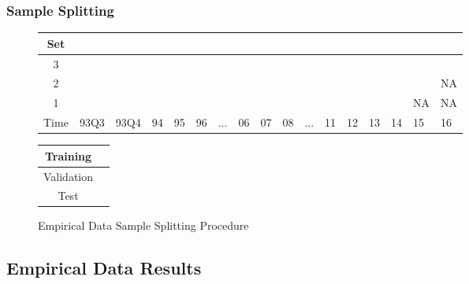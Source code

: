 \documentclass[aspectratio=169]{beamer}
\begin{document}
\begin{frame}
\frametitle{Sample Splitting}
\begin{figure}
	\begin{center}
		\begin{tabular}{|c|p{0.60cm}p{0.60cm}p{0.40cm}p{0.40cm}p{0.40cm}p{0.40cm}p{0.40cm}p{0.40cm}p{0.40cm}p{0.40cm}p{0.40cm}p{0.40cm}p{0.40cm}p{0.40cm}p{0.40cm}p{0.40cm}|}
			\hline
			Set &&&&&&&&&&&&&&&& \\
			\hline
			3 & \cellcolor{cyan} & \cellcolor{cyan} & \cellcolor{cyan} & \cellcolor{cyan} & \cellcolor{cyan} & \cellcolor{cyan} & \cellcolor{cyan} & \cellcolor{cyan} &
			\cellcolor{pink} & \cellcolor{pink} & \cellcolor{pink} & \cellcolor{pink} & \cellcolor{pink} & \cellcolor{pink} & \cellcolor{pink} & \cellcolor{olive} \\
			2 & \cellcolor{cyan} & \cellcolor{cyan} & \cellcolor{cyan} & \cellcolor{cyan} & \cellcolor{cyan} & \cellcolor{cyan} & \cellcolor{cyan} &
			\cellcolor{pink} & \cellcolor{pink} & \cellcolor{pink} & \cellcolor{pink} & \cellcolor{pink} & \cellcolor{pink} & \cellcolor{pink} & 	
			\cellcolor{olive} & NA \\
			1 & \cellcolor{cyan} & \cellcolor{cyan} & \cellcolor{cyan} & \cellcolor{cyan} & \cellcolor{cyan} & \cellcolor{cyan} &
			\cellcolor{pink} & \cellcolor{pink} & \cellcolor{pink} & \cellcolor{pink} & \cellcolor{pink} & \cellcolor{pink} & \cellcolor{pink} & \cellcolor{olive} & NA & NA \\
			\hline
			Time & 93Q3 & 93Q4 & 94 & 95 & 96 & ... & 06 & 07 & 08 & ... & 11 & 12 & 13 & 14 & 15 & 16 \\
			\hline
		\end{tabular}
		\medskip
		\begin{tabular}{|c|p{0.60cm}|}
			\hline
			Training & \cellcolor{cyan} \\
			\hline
			Validation & \cellcolor{pink} \\
			\hline
			Test & \cellcolor{olive} \\
			\hline
		\end{tabular}
	\end{center}
	\caption{Empirical Data Sample Splitting Procedure}
	\label{emp_sample_split_diag}
\end{figure}
\end{frame}

\subsection{Empirical Data Results}
\end{document}
